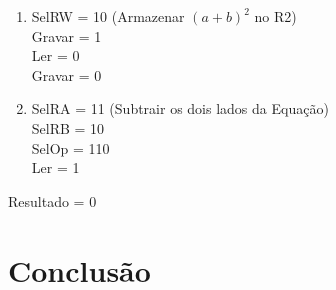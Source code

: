 \documentclass[]{article}
\begin{document}
\begin{enumerate}
			\item SelRW = 10 (Armazenar $(a+b)^2$ no R2)
			\\ Gravar = 1
			\\ Ler = 0
			\\ Gravar = 0
			
			\item SelRA = 11 (Subtrair os dois lados da Equação)
			\\ SelRB = 10
			\\ SelOp = 110
			\\ Ler = 1
		\end{enumerate}
		Resultado = 0
\section{Conclusão}

	

	
\end{document}
